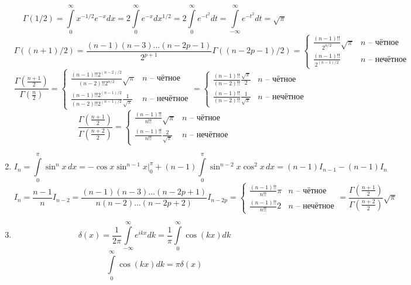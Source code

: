 \begin{enumerate}
	\[
		\Gamma(1/2) = \int\limits_0^\infty x^{-1/2} e^{-x} dx = 2 \int\limits_0^\infty e^{-x} dx^{1/2} =
		2 \int\limits_0^\infty e^{-t^2} dt = \int\limits_{-\infty}^\infty e^{-t^2} dt = \sqrt{\pi}
	\]
	\[
		\Gamma((n + 1)/2) = \frac{(n - 1)(n - 3)...(n - 2p - 1)}{2^{p+1}} \Gamma((n - 2p - 1)/2) =
		\begin{cases}
		\frac{(n - 1)!!}{2^{n/2}} \sqrt{\pi} & \text{$n$ -- чётное} \\
		\frac{(n - 1)!!}{2^{(n - 1)/2}} & \text{$n$ -- нечётное}
		\end{cases} 
	\]
	\[
		\frac{\Gamma\left(\frac{n + 1}{2}\right)}{\Gamma\left(\frac{n}{2}\right)}
		=
		\begin{cases}
		\frac{(n - 1)!! 2^{(n - 2)/2}}{(n - 2)!! 2^{n/2}} \sqrt{\pi} & \text{$n$ -- чётное} \\
		\frac{(n - 1)!! 2^{(n - 1)/2}}{(n - 2)!! 2^{(n - 1)/2}} \frac{1}{\sqrt{\pi}} & \text{$n$ -- нечётное}
		\end{cases}
		=
		\begin{cases}
		\frac{(n - 1)!!}{(n - 2)!!} \frac{\sqrt{\pi}}{2} & \text{$n$ -- чётное} \\
		\frac{(n - 1)!!}{(n - 2)!!} \frac{1}{\sqrt{\pi}} & \text{$n$ -- нечётное}
		\end{cases}
	\]
	\[
		\frac{\Gamma\left(\frac{n + 1}{2}\right)}{\Gamma\left(\frac{n + 2}{2}\right)}
		=
		\begin{cases}
		\frac{(n - 1)!!}{n!!} \sqrt{\pi} & \text{$n$ -- чётное} \\
		\frac{(n - 1)!!}{n!!} \frac{2}{\sqrt{\pi}} & \text{$n$ -- нечётное}
		\end{cases}
	\]
	\item
	\[
		I_n = \int\limits_0^\pi \sin^n x \, dx = - \cos x \sin^{n - 1} x \Big|_0^\pi + (n - 1) \int\limits_0^\pi \sin^{n - 2} x \cos^2 x \, dx = 
		(n - 1) I_{n - 1} - (n - 1) I_n 
	\] 
	\[
		I_n = \frac{n - 1}{n} I_{n - 2} = \frac{(n - 1)(n - 3)...(n - 2p +  1)}{n(n - 2)...(n - 2p + 2)} I_{n - 2p} =
		\begin{cases}
		\frac{(n - 1)!!}{n!!} \pi  & \text{$n$ -- чётное}\\
		\frac{(n - 1)!!}{n!!} 2 & \text{$n$ -- нечётное}
		\end{cases}
		=
		\frac{\Gamma\left(\frac{n + 1}{2}\right)}{\Gamma\left(\frac{n + 2}{2}\right)} \sqrt{\pi}
	\]
	\item
	\[
		\delta(x) = \frac{1}{2\pi} \int\limits_{-\infty}^{\infty} e^{ikx} dk = \frac{1}{\pi} \int\limits_{0}^{\infty} \cos (kx) dk
	\]
	\[
		\int\limits_{0}^{\infty} \cos (kx) dk = \pi \delta(x)
\]
\end{enumerate}
